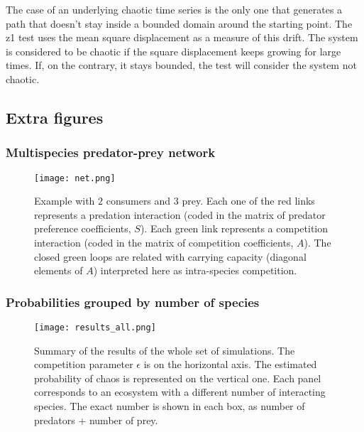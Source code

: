 The case of an underlying chaotic time series is the only one that generates a path that doesn't stay inside a bounded domain around the starting point. The z1 test uses the mean square displacement as a measure of this drift. The system is considered to be chaotic if the square displacement keeps growing for large times. If, on the contrary, it stays bounded, the test will consider the system not chaotic.


\subsection{Extra figures}
\label{subsec:ExtraFigures}

\subsubsection{Multispecies predator-prey network}
\label{subsubsec:MultispeciesPPNetwork}
\begin{figure}[H]
	\begin{center}
		\texttt{[image: net.png]}
	\end{center}
	\caption{Example with $2$ consumers and $3$ prey. Each one of the red links represents a predation interaction (coded in the matrix of predator preference coefficients, $ S $). Each green link represents a competition interaction (coded in the matrix of competition coefficients, $ A $). The closed green loops are related with carrying capacity (diagonal elements of $ A $) interpreted here as intra-species competition.}
	\label{fig:Network}
\end{figure}

\subsubsection{Probabilities grouped by number of species}
\label{subsubsec:AllProbabilities}
\begin{figure}[H]
	\begin{center}
		\texttt{[image: results\_all.png]}
	\end{center}
	\caption{Summary of the results of the whole set of simulations. The competition parameter $\epsilon$ is on the horizontal axis. The estimated probability of chaos is represented on the vertical one. Each panel corresponds to an ecosystem with a different number of interacting species. The exact number is shown in each box, as number of predators + number of prey.}
	\label{fig:AllProbabilities}
\end{figure}

